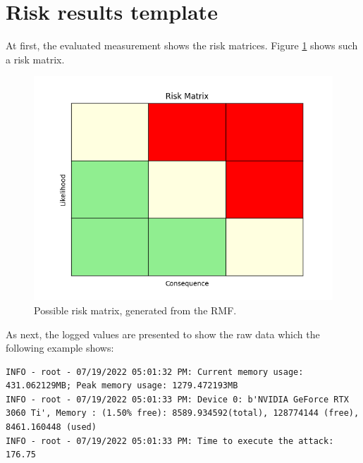 \section{Risk results template}
\label{sec:template}

At first, the evaluated measurement shows the risk matrices. Figure \ref{fig:rm_template} shows such a risk matrix.

\begin{figure}[h!]
  \centering
  \includegraphics[width=12cm]{pictures/rm_template.png}
  \caption{Possible risk matrix, generated from the RMF.}
  \label{fig:rm_template}
\end{figure}

As next, the logged values are presented to show the raw data which the following example shows:

\begin{lstlisting}
INFO - root - 07/19/2022 05:01:32 PM: Current memory usage: 431.062129MB; Peak memory usage: 1279.472193MB
INFO - root - 07/19/2022 05:01:33 PM: Device 0: b'NVIDIA GeForce RTX 3060 Ti', Memory : (1.50% free): 8589.934592(total), 128774144 (free), 8461.160448 (used)
INFO - root - 07/19/2022 05:01:33 PM: Time to execute the attack: 176.75
\end{lstlisting}
